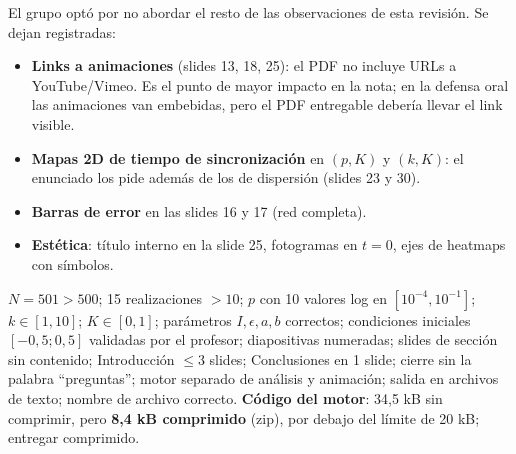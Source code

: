 \documentclass[11pt]{article}
\begin{document}
\begin{tcolorbox}[colback=white,colframe=gray!55!black,title=\textbf{Desestimadas por decisión del grupo}]
\small
El grupo optó por no abordar el resto de las observaciones de esta revisión. Se dejan registradas:
\begin{itemize}[leftmargin=1.2em,nosep]
  \item \textbf{Links a animaciones} (slides 13, 18, 25): el PDF no incluye URLs a YouTube/Vimeo. Es el punto de mayor impacto en la nota; en la defensa oral las animaciones van embebidas, pero el PDF entregable debería llevar el link visible.
  \item \textbf{Mapas 2D de tiempo de sincronización} en $(p,K)$ y $(k,K)$: el enunciado los pide además de los de dispersión (slides 23 y 30).
  \item \textbf{Barras de error} en las slides 16 y 17 (red completa).
  \item \textbf{Estética}: título interno en la slide 25, fotogramas en $t=0$, ejes de heatmaps con símbolos.
\end{itemize}
\end{tcolorbox}

\begin{tcolorbox}[colback=white,colframe=green!55!black,title=\textbf{OK · Lo que sí cumple}]
\small
$N=501>500$; 15 realizaciones $>10$; $p$ con 10 valores log en $[10^{-4},10^{-1}]$; $k\in[1,10]$; $K\in[0,1]$; parámetros $I,\epsilon,a,b$ correctos; condiciones iniciales $[-0{,}5;0{,}5]$ validadas por el profesor; diapositivas numeradas; slides de sección sin contenido; Introducción $\le 3$ slides; Conclusiones en 1 slide; cierre sin la palabra ``preguntas''; motor separado de análisis y animación; salida en archivos de texto; nombre de archivo correcto. \textbf{Código del motor}: 34,5 kB sin comprimir, pero \textbf{8,4 kB comprimido} (zip), por debajo del límite de 20 kB; entregar comprimido.
\end{tcolorbox}
\end{document}
